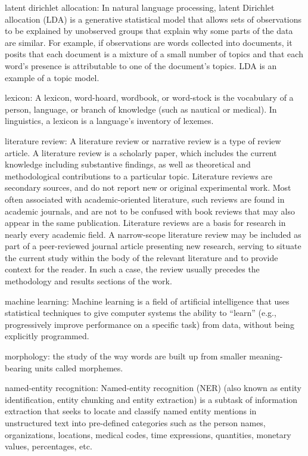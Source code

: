 \documentclass[]{book}
\begin{document}
latent dirichlet allocation: In natural language processing, latent
Dirichlet allocation (LDA) is a generative statistical model that allows
sets of observations to be explained by unobserved groups that explain
why some parts of the data are similar. For example, if observations are
words collected into documents, it posits that each document is a
mixture of a small number of topics and that each word's presence is
attributable to one of the document's topics. LDA is an example of a
topic model.

lexicon: A lexicon, word-hoard, wordbook, or word-stock is the
vocabulary of a person, language, or branch of knowledge (such as
nautical or medical). In linguistics, a lexicon is a language's
inventory of lexemes.

literature review: A literature review or narrative review is a type of
review article. A literature review is a scholarly paper, which includes
the current knowledge including substantive findings, as well as
theoretical and methodological contributions to a particular topic.
Literature reviews are secondary sources, and do not report new or
original experimental work. Most often associated with academic-oriented
literature, such reviews are found in academic journals, and are not to
be confused with book reviews that may also appear in the same
publication. Literature reviews are a basis for research in nearly every
academic field. A narrow-scope literature review may be included as part
of a peer-reviewed journal article presenting new research, serving to
situate the current study within the body of the relevant literature and
to provide context for the reader. In such a case, the review usually
precedes the methodology and results sections of the work.

machine learning: Machine learning is a field of artificial intelligence
that uses statistical techniques to give computer systems the ability to
``learn'' (e.g., progressively improve performance on a specific task)
from data, without being explicitly programmed.

morphology: the study of the way words are built up from smaller
meaning-bearing units called morphemes.

named-entity recognition: Named-entity recognition (NER) (also known as
entity identification, entity chunking and entity extraction) is a
subtask of information extraction that seeks to locate and classify
named entity mentions in unstructured text into pre-defined categories
such as the person names, organizations, locations, medical codes, time
expressions, quantities, monetary values, percentages, etc.
\end{document}
